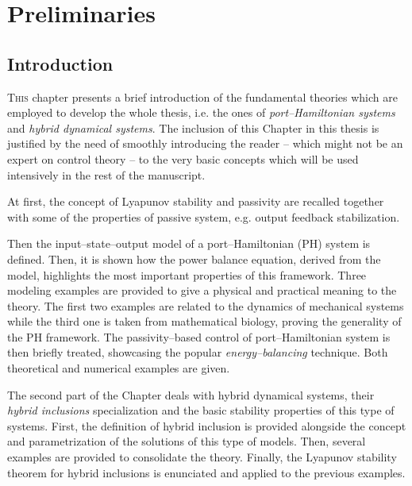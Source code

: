 
\chapter{Preliminaries}
\label{chap:preliminaries}
\minitoc

\thispagestyle{empty}

\newpage
{}
%
\section{Introduction\label{sec:2_intro}}
\lettrine[lines=4]{\color{brickred}T}{his} chapter presents a brief introduction of the fundamental theories which are employed to develop the whole thesis, i.e. the ones of \textit{port--Hamiltonian systems} and \textit{hybrid dynamical systems}. The inclusion of this Chapter in this thesis is justified by the need of smoothly introducing the reader -- which might not be an expert on control theory -- to the very basic concepts which will be used intensively in the rest of the manuscript.
%
\newline

%
At first, the concept of Lyapunov stability and passivity are recalled together with some of the properties of passive system, e.g. output feedback stabilization.
%
\newline

%
Then the input--state--output model of a port--Hamiltonian (PH) system is defined. Then, it is shown how the power balance equation, derived from the model, highlights the most important properties of this framework. Three modeling examples are provided to give a physical and practical meaning to the theory. The first two examples are related to the dynamics of mechanical systems while the third one is taken from mathematical biology, proving the generality of the PH framework.   
The passivity--based control of port--Hamiltonian system is then briefly treated, showcasing the popular \textit{energy--balancing} technique. Both theoretical and numerical examples are given. 
%
\newline

%
The second part of the Chapter deals with hybrid dynamical systems, their \textit{hybrid inclusions} specialization and the basic stability properties of this type of systems. First, the definition of hybrid inclusion is provided alongside the concept and parametrization of the solutions of this type of models. Then, several examples are provided to consolidate the theory. Finally, the Lyapunov stability theorem for hybrid inclusions is enunciated and applied to the previous examples. 
%

